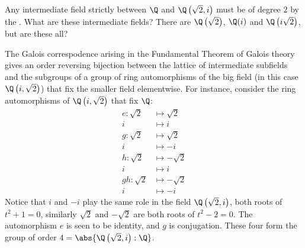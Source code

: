 \documentclass{article}
\begin{document}
Any intermediate field strictly between $\Q$ and $\Q\left(\sqrt{2}, i\right)$ must be of degree $2$ by the .
What are these intermediate fields? There are $\Q\left(\sqrt{2}\right)$, $\Q(i)$ and $\Q\left(i\sqrt{2}\right)$, but are these all?

The Galois correspodence arising in the Fundamental Theorem of Galois theory gives an order reversing bijection between the lattice of intermediate subfields and the subgroups of a group of ring automorphisms of the big field (in this case $\Q\left(i, \sqrt{2}\right)$) that fix the smaller field elementwise.
For instance, consider the ring automorphisms of $\Q\left(i, \sqrt{2}\right)$ that fix $\Q$:
\begin{align*}
    e : \sqrt{2} &\mapsto \sqrt{2} \\
               i &\mapsto i \\
    g : \sqrt{2} &\mapsto \sqrt{2} \\
               i &\mapsto -i \\
    h : \sqrt{2} &\mapsto -\sqrt{2} \\
               i &\mapsto i \\
    gh: \sqrt{2} &\mapsto -\sqrt{2} \\
               i &\mapsto -i
\end{align*}
Notice that $i$ and $-i$ play the same role in the field $\Q\left(\sqrt{2}, i\right)$, both roots of $t^2 + 1 = 0$, similarly $\sqrt{2}$ and $-\sqrt{2}$ are both roots of $t^2 - 2 = 0$.  The automorphism $e$ is seen to be identity, and $g$ is conjugation.
These four form the group of order $4 = \abs{\Q\left(\sqrt{2}, i\right) : \Q}$.

\begin{center}
\end{center}
\end{document}
